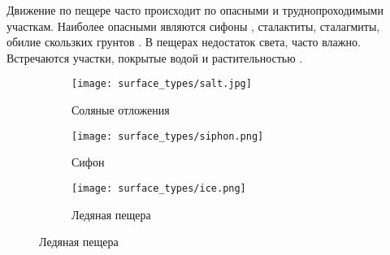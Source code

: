 {\actuality} Движение по пещере часто происходит по опасными и труднопроходимыми участкам. Наиболее опасными являются сифоны , сталактиты, сталагмиты, обилие скользких грунтов . В пещерах недостаток света, часто влажно. Встречаются участки, покрытые водой  и растительностью .

\begin{figure}[H]
  \begin{subfigure}[b]{0.3\textwidth}
      \centering\texttt{[image: surface\_types/salt.jpg]}\\
      \caption{Соляные отложения}
      \label{fig:surface_types/salt}
  \end{subfigure}
  \hfill
  \begin{subfigure}[b]{0.3\textwidth}
      \centering\texttt{[image: surface\_types/siphon.png]}\\
      \caption{Сифон}
      \label{fig:surface_types/syphon}
  \end{subfigure}
  \hfill
  \begin{subfigure}[b]{0.3\textwidth}
      \centering\texttt{[image: surface\_types/ice.png]}\\
      \caption{Ледяная пещера}
      \label{fig:surface_types/ice}
  \end{subfigure}


\end{figure}
